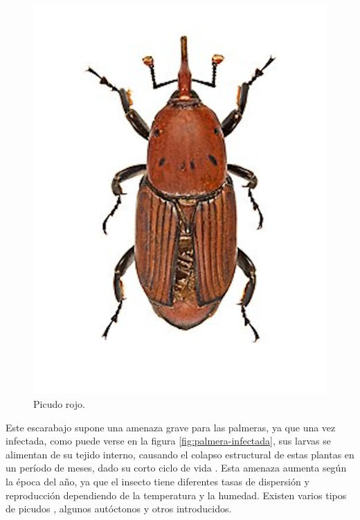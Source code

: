 \begin{figure}[htpb]
  \centering
  \includegraphics[scale=1]{./Figures/picudo-rojo.png}
  \caption{Picudo rojo\protect\footnotemark.}
  \label{fig:picudo-rojo}
\end{figure}


Este escarabajo supone una amenaza grave para las palmeras, ya que una vez infectada, como puede verse en la figura \ref{fig:palmera-infectada}, sus larvas se alimentan de su tejido interno, causando el colapso estructural de estas plantas en un período de meses, dado su corto ciclo de vida \citep{anticimex_picudo_nodate}. Esta amenaza aumenta según la época del año, ya que el insecto tiene diferentes tasas de dispersión y reproducción dependiendo de la temperatura y la humedad. Existen varios tipos de picudos \citep{poplin_palm_2014}, algunos autóctonos y otros introducidos.

